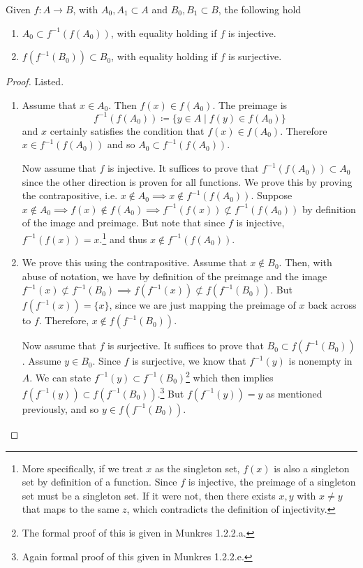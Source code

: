 \documentclass{article}
\begin{document}
    \begin{theorem}
      Given $f: A \rightarrow B$, with $A_0, A_1 \subset A$ and $B_0, B_1 \subset B$, the following hold 
      \begin{enumerate}
        \item $A_0 \subset f^{-1} (f(A_0))$, with equality holding if $f$ is injective. 
        \item $f(f^{-1}(B_0)) \subset B_0$, with equality holding if $f$ is surjective. 
      \end{enumerate}
    \end{theorem} 
    \begin{proof} 
      Listed. 
      \begin{enumerate}
        \item Assume that $x \in A_0$. Then $f(x) \in f(A_0)$. The preimage is 
        \begin{equation}
          f^{-1} (f(A_0)) \coloneqq \{ y \in A \mid f(y) \in f(A_0) \}
        \end{equation}
        and $x$ certainly satisfies the condition that $f(x) \in f(A_0)$. Therefore $x \in f^{-1} (f(A_0))$ and so $A_0 \subset f^{-1} (f(A_0))$. 

        Now assume that $f$ is injective. It suffices to prove that $f^{-1} (f(A_0)) \subset A_0$ since the other direction is proven for all functions. We prove this by proving the contrapositive, i.e. $x \not\in A_0 \implies x \not\in f^{-1} (f(A_0))$. Suppose $x \not\in A_0 \implies f(x) \not\in f(A_0) \implies f^{-1} (f(x)) \not\subset f^{-1} (f(A_0))$ by definition of the image and preimage. But note that since $f$ is injective, $f^{-1} (f(x)) = x$.\footnote{More specifically, if we treat $x$ as the singleton set, $f(x)$ is also a singleton set by definition of a function. Since $f$ is injective, the preimage of a singleton set must be a singleton set. If it were not, then there exists $x, y$ with $x \neq y$ that maps to the same $z$, which contradicts the definition of injectivity.} and thus $x \not\in f^{-1} (f(A_0))$. 

        \item We prove this using the contrapositive. Assume that $x \not\in B_0$. Then, with abuse of notation, we have by definition of the preimage and the image $f^{-1} (x) \not\subset f^{-1} (B_0) \implies f(f^{-1} (x)) \not\subset f(f^{-1}(B_0))$. But $f (f^{-1} (x)) = \{x\}$, since we are just mapping the preimage of $x$ back across to $f$. Therefore, $x \notin f( f^{-1} (B_0))$. 

        Now assume that $f$ is surjective. It suffices to prove that $B_0 \subset f (f^{-1}(B_0))$. Assume $y \in B_0$. Since $f$ is surjective, we know that $f^{-1} (y)$ is nonempty in $A$. We can state $f^{-1}(y) \subset f^{-1} (B_0)$\footnote{The formal proof of this is given in Munkres 1.2.2.a.} which then implies $f(f^{-1} (y)) \subset f (f^{-1} (B_0))$.\footnote{Again formal proof of this given in Munkres 1.2.2.e.} But $f (f^{-1} (y)) = y$ as mentioned previously, and so $y \in f(f^{-1} (B_0))$. 
      \end{enumerate}
    \end{proof}
\end{document}
